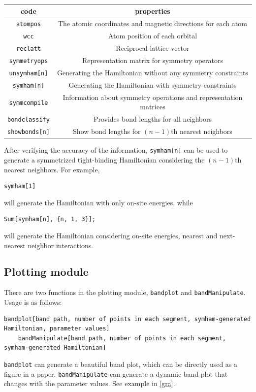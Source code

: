 \documentclass[titlepage,a4paper,12pt,AutoFakeBold]{article}
\begin{document}
\begin{table}[ht]
	\centering
	\label{tab:pro} %
	\begin{tabular}{c|c}
		\hline
		code & properties \tabularnewline
		\hline
		\lstinline!atompos! & The atomic coordinates and magnetic directions for each atom \tabularnewline
		\hline
		\lstinline!wcc! & Atom position of each orbital \tabularnewline
		\hline
		\lstinline!reclatt! & Reciprocal lattice vector \tabularnewline
		\hline
		\lstinline!symmetryops! & Representation matrix for symmetry operators \tabularnewline
		\hline
		\lstinline!unsymham[n]! & Generating the Hamiltonian without any symmetry constraints \tabularnewline
		\hline
		\lstinline!symham[n]! & Generating the Hamiltonian with symmetry constraints \tabularnewline
		\hline
		\lstinline!symmcompile! & Information about symmetry operations and representation matrices \tabularnewline
		\hline
		\lstinline!bondclassify! & Provides bond lengths for all neighbors \tabularnewline
		\hline
		\lstinline!showbonds[n]! & Show bond lengths for $(n-1)$th nearest neighbors \tabularnewline
		\hline
	\end{tabular}
\end{table}

After verifying the accuracy of the information, \lstinline|symham[n]| can be used to generate a symmetrized tight-binding Hamiltonian considering the $(n-1)$th nearest neighbors. For example,
\begin{lstlisting}[numbers=none]
	symham[1]
\end{lstlisting}
will generate the Hamiltonian with only on-site energies, while
\begin{lstlisting}[numbers=none]
	Sum[symham[n], {n, 1, 3}];
\end{lstlisting}
will generate the Hamiltonian considering on-site energies, nearest and next-nearest neighbor interactions.

\subsection{Plotting module}
There are two functions in the plotting module, \lstinline|bandplot| and \lstinline|bandManipulate|. Usage is as follows:
\begin{lstlisting}[numbers=none]
	bandplot[band path, number of points in each segment, symham-generated Hamiltonian, parameter values]
	bandManipulate[band path, number of points in each segment, symham-generated Hamiltonian]
\end{lstlisting}
\lstinline|bandplot| can generate a beautiful band plot, which can be directly used as a figure in a paper. \lstinline|bandManipulate| can generate a dynamic band plot that changes with the parameter values. See example in \ref{gra}.
\end{document}
